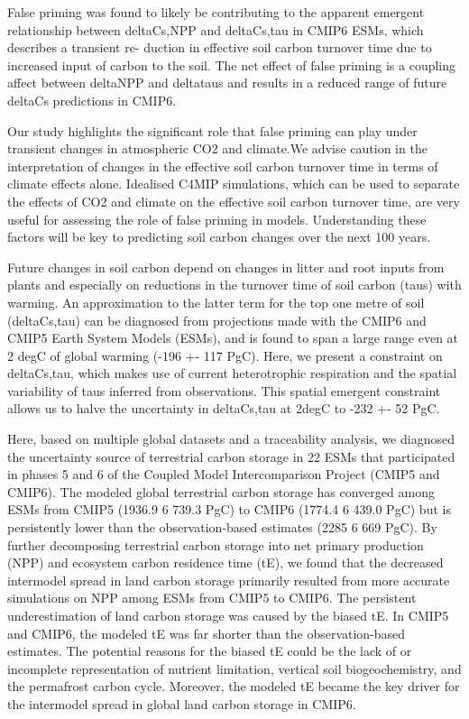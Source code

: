 \documentclass{article}
\begin{document}
False priming was found to likely be contributing to the apparent emergent relationship between deltaCs,NPP and deltaCs,tau in CMIP6 ESMs, which describes a transient re-
duction in effective soil carbon turnover time due to increased input of carbon to the soil. The net effect of false priming is a coupling affect between deltaNPP and deltataus and results in a reduced range of future deltaCs predictions in CMIP6.

Our study highlights the signiﬁcant role that false priming can play under transient changes in atmospheric CO2 and climate.We advise caution in the interpretation of changes in the effective soil carbon turnover time in terms of climate effects alone. Idealised C4MIP simulations, which can be used to separate the effects of CO2 and climate on the effective soil carbon turnover time, are very useful for assessing the role of false priming in models. Understanding these factors will be key to
predicting soil carbon changes over the next 100 years.

\citep{Varney2020}
Future changes in soil carbon depend on changes in litter and root inputs from plants and especially on reductions in the turnover time of soil carbon (taus) with warming. An approximation to the
latter term for the top one metre of soil (deltaCs,tau) can be diagnosed from projections made with the CMIP6 and CMIP5 Earth System Models (ESMs), and is found to span a large range even
at 2 degC of global warming (-196 +- 117 PgC). Here, we present a constraint on deltaCs,tau, which makes use of current heterotrophic respiration and the spatial variability of taus inferred from
observations. This spatial emergent constraint allows us to halve the uncertainty in deltaCs,tau at 2degC to -232 +- 52 PgC.

\citep{Wei2022}
Here, based on multiple global datasets and a traceability analysis, we diagnosed the uncertainty source of terrestrial carbon storage in 22 ESMs that participated in phases 5 and 6 of the Coupled Model Intercomparison Project (CMIP5 and CMIP6). The modeled global terrestrial carbon storage has
converged among ESMs from CMIP5 (1936.9 6 739.3 PgC) to CMIP6 (1774.4 6 439.0 PgC) but is persistently lower than the observation-based estimates (2285 6 669 PgC). By further decomposing terrestrial carbon storage into net primary production (NPP) and ecosystem carbon residence time (tE), we found that the decreased intermodel spread in land carbon storage primarily resulted from more accurate simulations on NPP among ESMs from CMIP5 to CMIP6. The persistent underestimation of land carbon storage was caused by the biased tE. In CMIP5 and CMIP6, the modeled tE was far shorter
than the observation-based estimates. The potential reasons for the biased tE could be the lack of or incomplete representation of nutrient limitation, vertical soil biogeochemistry, and the permafrost carbon cycle. Moreover, the modeled tE became the key driver for the intermodel spread in global land carbon storage in CMIP6.
\end{document}
